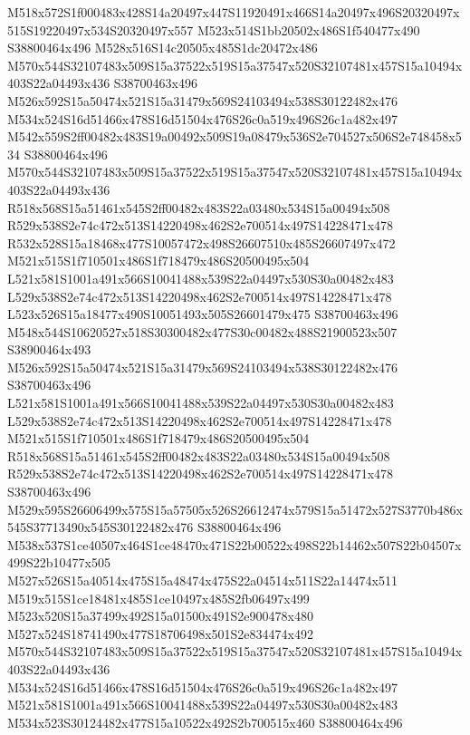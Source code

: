 \documentclass{article}
\begin{document}
\begin{multicols}{2}
M518x572S1f000483x428S14a20497x447S11920491x466S14a20497x496S20320497x515S19220497x534S20320497x557 M523x514S1bb20502x486S1f540477x490 S38800464x496 M528x516S14c20505x485S1dc20472x486 M570x544S32107483x509S15a37522x519S15a37547x520S32107481x457S15a10494x403S22a04493x436 S38700463x496 M526x592S15a50474x521S15a31479x569S24103494x538S30122482x476 M534x524S16d51466x478S16d51504x476S26c0a519x496S26c1a482x497 M542x559S2ff00482x483S19a00492x509S19a08479x536S2e704527x506S2e748458x534 S38800464x496 M570x544S32107483x509S15a37522x519S15a37547x520S32107481x457S15a10494x403S22a04493x436 R518x568S15a51461x545S2ff00482x483S22a03480x534S15a00494x508 R529x538S2e74c472x513S14220498x462S2e700514x497S14228471x478 R532x528S15a18468x477S10057472x498S26607510x485S26607497x472 M521x515S1f710501x486S1f718479x486S20500495x504 L521x581S1001a491x566S10041488x539S22a04497x530S30a00482x483 L529x538S2e74c472x513S14220498x462S2e700514x497S14228471x478 L523x526S15a18477x490S10051493x505S26601479x475 S38700463x496 M548x544S10620527x518S30300482x477S30c00482x488S21900523x507 S38900464x493 M526x592S15a50474x521S15a31479x569S24103494x538S30122482x476 S38700463x496 L521x581S1001a491x566S10041488x539S22a04497x530S30a00482x483 L529x538S2e74c472x513S14220498x462S2e700514x497S14228471x478 M521x515S1f710501x486S1f718479x486S20500495x504 R518x568S15a51461x545S2ff00482x483S22a03480x534S15a00494x508 R529x538S2e74c472x513S14220498x462S2e700514x497S14228471x478 S38700463x496 M529x595S26606499x575S15a57505x526S26612474x579S15a51472x527S3770b486x545S37713490x545S30122482x476 S38800464x496 M538x537S1ce40507x464S1ce48470x471S22b00522x498S22b14462x507S22b04507x499S22b10477x505 M527x526S15a40514x475S15a48474x475S22a04514x511S22a14474x511 M519x515S1ce18481x485S1ce10497x485S2fb06497x499 M523x520S15a37499x492S15a01500x491S2e900478x480 M527x524S18741490x477S18706498x501S2e834474x492 M570x544S32107483x509S15a37522x519S15a37547x520S32107481x457S15a10494x403S22a04493x436 M534x524S16d51466x478S16d51504x476S26c0a519x496S26c1a482x497 M521x581S1001a491x566S10041488x539S22a04497x530S30a00482x483 M534x523S30124482x477S15a10522x492S2b700515x460 S38800464x496




\end{multicols}
\end{document}
